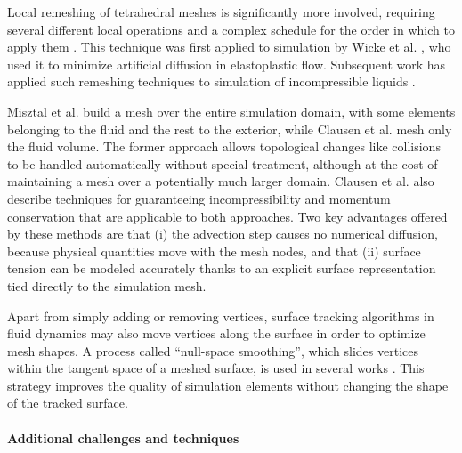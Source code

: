 Local remeshing of tetrahedral meshes is significantly more involved, requiring several different local operations and a complex schedule for the order in which to apply them \cite{Klingner2007}.
This technique was first applied to simulation by Wicke et al. \cite{Wicke2010}, who used it to minimize artificial diffusion in elastoplastic flow.
Subsequent work has applied such remeshing techniques to simulation of incompressible liquids \cite{Misztal2012a,Misztal2012b,Clausen2013}.

Misztal et al. \cite{Misztal2012a,Misztal2012b} build a mesh over the entire simulation domain, with some elements belonging to the fluid and the rest to the exterior, while Clausen et al. \cite{Clausen2013} mesh only the fluid volume.
The former approach allows topological changes like collisions to be handled automatically without special treatment, although at the cost of maintaining a mesh over a potentially much larger domain.
Clausen et al. also describe techniques for guaranteeing incompressibility and momentum conservation that are applicable to both approaches. 
Two key advantages offered by these methods are that (i) the advection step causes no numerical diffusion, because physical quantities move with the mesh nodes, and that (ii) surface tension can be modeled accurately thanks to an explicit surface representation tied directly to the simulation mesh.

Apart from simply adding or removing vertices, surface tracking algorithms in fluid dynamics may also move vertices along the surface in order to optimize mesh shapes.
A process called ``null-space smoothing'', which slides vertices within the tangent space of a meshed surface, is used in several works \cite{Jiao2007,Brochu2009,Brochu2010,Wicke2010,Clausen2013}.
This strategy improves the quality of simulation elements without changing the shape of the tracked surface.

\paragraph*{Additional challenges and techniques}

